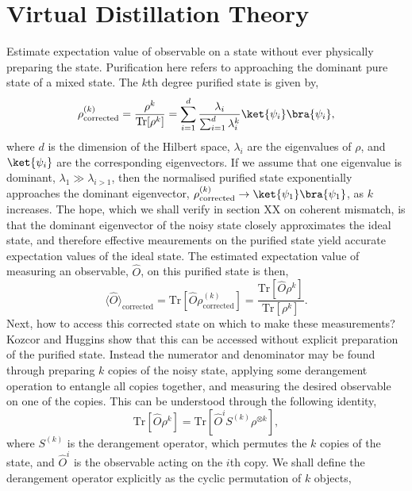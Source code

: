 \section{Virtual Distillation Theory}
Estimate expectation value of observable on a state without ever physically preparing the state.
Purification here refers to approaching the dominant pure state of a mixed state. The $k$th degree purified state is given by,
\begin{equation}
    \rho_\mathrm{corrected}^{(k)}=\frac{\rho^k}{\mathrm{Tr}[\rho^k]}=\sum_{i=1}^{d} \frac{\lambda_i }{\sum_{i=1}^d \lambda_i^k} \ket{\psi_i}\bra{\psi_i},
\end{equation}
where $d$ is the dimension of the Hilbert space, $\lambda_i$ are the eigenvalues of $\rho$, and $\ket{\psi_i}$ are the corresponding eigenvectors. If we assume that one eigenvalue is dominant, $\lambda_1 \gg \lambda_{i>1}$, then the normalised purified state exponentially approaches the dominant eigenvector, $\rho_\mathrm{corrected}^{(k)} \to \ket{\psi_1}\bra{\psi_1}$, as $k$ increases.
The hope, which we shall verify in section XX on coherent mismatch, is that the dominant eigenvector of the noisy state closely approximates the ideal state, and therefore effective meaurements on the purified state yield accurate expectation values of the ideal state.
The estimated expectation value of measuring an observable, $\hat{O}$, on this purified state is then,
\begin{equation}
    \langle\hat{O}\rangle_\mathrm{corrected}=\mathrm{Tr}[\hat{O}\rho_\mathrm{corrected}^{(k)}]=\frac{\mathrm{Tr}[\hat{O}\rho^k]}{\mathrm{Tr}[\rho^k]}.
\end{equation}
Next, how to access this corrected state on which to make these measurements? Kozcor and Huggins show that this can be accessed without explicit preparation of the purified state. Instead the numerator and denominator may be found through preparing $k$ copies of the noisy state, applying some derangement operation to entangle all copies together, and measuring the desired observable on one of the copies. This can be understood through the following identity,
\begin{equation}
    \mathrm{Tr}[\hat{O}\rho^k]=\mathrm{Tr}[\hat{O}^iS^{(k)}\rho^{\otimes k}],
\end{equation}
where $S^{(k)}$ is the derangement operator, which permutes the $k$ copies of the state, and $\hat{O}^i$ is the observable acting on the $i$th copy. We shall define the derangement operator explicitly as the cyclic permutation of $k$ objects,
